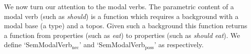 We now turn our attention to the modal verbs.  The parametric content
of a modal verb (such as \textit{should}) is a function which requires a background with a modal
base (a type) and a topos.  Given such a background this function
returns a function from properties (such as \textit{eat}) to
properties (such as \textit{should eat}).  We define
`SemModalVerb$_{\mathrm{nec}}$' and `SemModalVerb$_{\mathrm{poss}}$'
as  respectively.
\begin{ex} 
\begin{subex} 
 
\item {}
 
\item {} 
 
\end{subex} 
   
\end{ex} 
  

